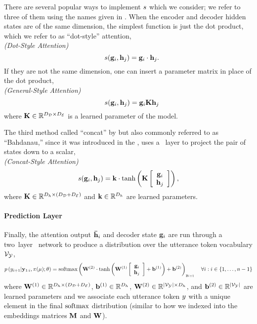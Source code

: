 There are several popular ways to implement $s$ which we consider; we refer to three of them
using the names given in \citet{luong2015}. When the encoder and decoder
hidden states are of the same dimension, the simplest function is just the dot product, which 
we refer to as ``dot-style'' attention,\\
\textit{(Dot-Style Attention)}
\[ \quad s(\mathbf{g}_i,\mathbf{h}_j) = \mathbf{g}_i \cdot \mathbf{h}_j. \]
If they are not the same dimension, one can insert a parameter matrix in place of the dot product,\\
\textit{(General-Style Attention)}
\[ \quad s(\mathbf{g}_i,\mathbf{h}_j) = \mathbf{g}_i \mathbf{K} \mathbf{h}_j \]
where $\mathbf{K} \in \mathbb{R}^{{D_\mathcal{D}} \times {D_\mathcal{E}}}$ is a learned parameter of the model.

The third method called ``concat'' by \citet{luong2015} but also commonly
referred to as ``Bahdanau,'' since it was introduced in the 
\citet{bahdanau2015}, uses a \feedforward~layer to project the pair of states
down to a scalar,\\
\textit{(Concat-Style Attention)}
\[ s(\mathbf{g}_i, \mathbf{h}_j) = \mathbf{k}\cdot\tanh\left(\mathbf{K}\left[ \begin{array}{c} \mathbf{g}_i \\ \mathbf{h}_j \end{array} \right] \right),  \]
    where $\mathbf{K} \in \mathbb{R}^{D_{h} \times ({D_\mathcal{D}} + {D_\mathcal{E}})}$
    and $\mathbf{k} \in \mathbb{R}^{D_{h}}$ are learned parameters.



\paragraph{{Prediction Layer}}
Finally, the attention output ${\boldsymbol{\bar{\mathbf{h}}}}_i$ and decoder state $\mathbf{g}_i$
are run through a two~layer \feedforward~network to produce a distribution
over the utterance token vocabulary $\mathcal{V}_{\mathcal{Y}}$,
\[ p\left(y_{i+1}|\mathbf{y}_{1:i},\pi(\mu);\theta\right) = \operatorname*{softmax}\left(   \mathbf{W}^{(2)}\cdot \tanh\left(\mathbf{W}^{(1)} \left[ \begin{array}{c}\mathbf{g}_i \\ \mathbf{h}_j \end{array} \right] + \mathbf{b}^{(1)}\right) + \mathbf{b}^{(2)} \right)_{y_{i+1}}\quad \forall i: i \in \{1,\ldots,n-1\} \]
    where $\mathbf{W}^{(1)} \in \mathbb{R}^{D_{h} \times \left({D_\mathcal{D}} + {D_\mathcal{E}}\right)}$,
    $\mathbf{b}^{(1)} \in \mathbb{R}^{D_{h}}$, $\mathbf{W}^{(2)} \in \mathbb{R}^{{\left\vert \mathcal{V}_{\mathcal{Y}} \right\vert} \times D_{h}}$, and $\mathbf{b}^{(2)}\in\mathbb{R}^{{\left\vert \mathcal{V}_{\mathcal{Y}} \right\vert}}$ are learned
    parameters and we associate each utterance token $y$ with a unique 
    element in the final $\operatorname*{softmax}$ distribution (similar to how we indexed
    into the embeddings matrices $\mathbf{M}$ and $\mathbf{W}$). 



